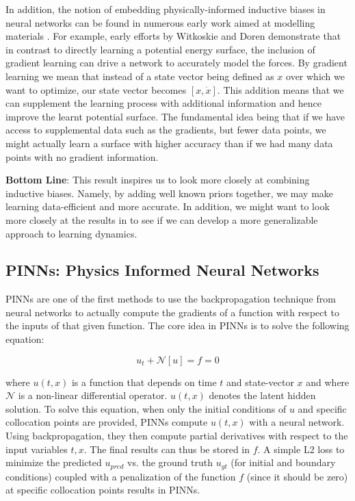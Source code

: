 \documentclass{article}
\begin{document}
In addition, the notion of embedding physically-informed inductive biases in neural networks can be found in numerous early work aimed at modelling materials \cite{witkoskie_neural_2005, pukrittayakamee_simultaneous_2009, smith_ani-1_2017, rupp_fast_2012, yao_tensormol-01_2018}. For example, early efforts by Witkoskie and Doren \cite{witkoskie_neural_2005} demonstrate that in contrast to directly learning a potential energy surface, the inclusion of gradient learning can drive a network to accurately model the forces. By gradient learning we mean that instead of a state vector being defined as $x$ over which we want to optimize, our state vector becomes $[x,\dot{x}]$. This addition means that we can supplement the learning process with additional information and hence improve the learnt potential surface. The fundamental idea being that if we have access to supplemental data such as the gradients, but fewer data points, we might actually learn a surface with higher accuracy than if we had many data points with no gradient information. 

\textbf{Bottom Line}: This result inspires us to look more closely at combining inductive biases. Namely, by adding well known priors together, we may make learning data-efficient and more accurate. In addition, we might want to look more closely at the results in \cite{howse_gradient_1996} to see if we can develop a more generalizable approach to learning dynamics.

\subsection{PINNs: Physics Informed Neural Networks}

PINNs are one of the first methods to use the backpropagation technique from neural networks to actually compute the gradients of a function with respect to the inputs of that given function. The core idea in PINNs is to solve the following equation:

\begin{equation}
 u_t + \mathcal{N}[u] = f = 0
\end{equation}

where $u(t,x)$ is a function that depends on time $t$ and state-vector $x$ and where $\mathcal{N}$ is a non-linear differential operator. $u(t,x)$ denotes the latent hidden solution. To solve this equation, when only the initial conditions of $u$ and specific collocation points are provided, PINNs compute $u(t,x)$ with a neural network. Using backpropagation, they then compute partial derivatives with respect to the input variables $t,x$. The final results can thus be stored in $f$. A simple L2 loss to minimize the predicted $u_{pred}$ vs. the ground truth $u_{gt}$ (for initial and boundary conditions) coupled with a penalization of the function $f$ (since it should be zero) at specific collocation points results in PINNs.
\end{document}
